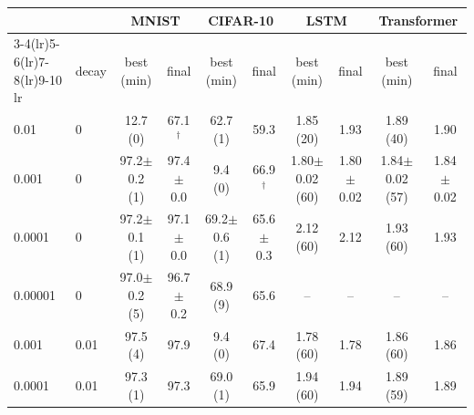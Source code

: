 \begin{tabular}{ll cc cc cc cc}
\toprule
 & & \multicolumn{2}{c}{MNIST} & \multicolumn{2}{c}{CIFAR-10} & \multicolumn{2}{c}{LSTM} & \multicolumn{2}{c}{Transformer} \\
\cmidrule(lr){3-4}\cmidrule(lr){5-6}\cmidrule(lr){7-8}\cmidrule(lr){9-10}
lr & decay & best (min) & final & best (min) & final & best (min) & final & best (min) & final \\
\midrule
0.01 & 0 & 12.7 (0) & 67.1$^\dagger$ & 62.7 (1) & 59.3 & 1.85 (20) & 1.93 & 1.89 (40) & 1.90 \\
0.001 & 0 & 97.2$\pm$0.2 (1) & 97.4$\pm$0.0 & 9.4 (0) & 66.9$^\dagger$ & 1.80$\pm$0.02 (60) & 1.80$\pm$0.02 & 1.84$\pm$0.02 (57) & 1.84$\pm$0.02 \\
0.0001 & 0 & 97.2$\pm$0.1 (1) & 97.1$\pm$0.0 & 69.2$\pm$0.6 (1) & 65.6$\pm$0.3 & 2.12 (60) & 2.12 & 1.93 (60) & 1.93 \\
0.00001 & 0 & 97.0$\pm$0.2 (5) & 96.7$\pm$0.2 & 68.9 (9) & 65.6 & -- & -- & -- & -- \\
0.001 & 0.01 & 97.5 (4) & 97.9 & 9.4 (0) & 67.4 & 1.78 (60) & 1.78 & 1.86 (60) & 1.86 \\
0.0001 & 0.01 & 97.3 (1) & 97.3 & 69.0 (1) & 65.9 & 1.94 (60) & 1.94 & 1.89 (59) & 1.89 \\
\bottomrule
\end{tabular}
